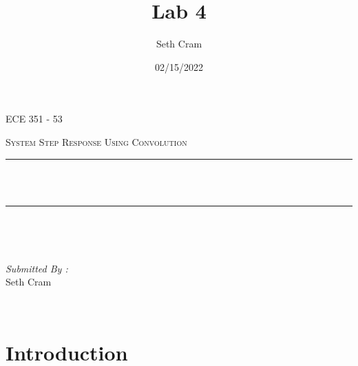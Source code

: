 \documentclass[12pt]{report}
\title{Lab 4}		%
\author{ Seth Cram}
\date{02/15/2022}
\makeatletter
\let\thetitle\@title
\makeatother
\begin{document}

\begin{titlepage}
	\centering
    \vspace*{0.5 cm}
\begin{center}    \textsc{\Large   ECE 351 - 53 }\\[2.0 cm]	\end{center}%
	\textsc{\Large System Step Response Using Convolution }\\[.5 cm]				%
	\rule{\linewidth}{0.2 mm} \\[0.4 cm]
	{ \huge \bfseries \thetitle}\\
	\rule{\linewidth}{0.2 mm} \\[1.5 cm]
	
	\begin{minipage}{0.4\textwidth}
		\begin{flushleft} \large
			\end{flushleft}
			\end{minipage}~
			\begin{minipage}{0.4\textwidth}
            
			\begin{flushright} \large
			\emph{Submitted By :} \\
			Seth Cram  
		\end{flushright}
           
	\end{minipage}\\[2 cm]
	
\end{titlepage}


\tableofcontents
\pagebreak

\renewcommand{\thesection}{\arabic{section}}

\section{Introduction}
\end{document}
